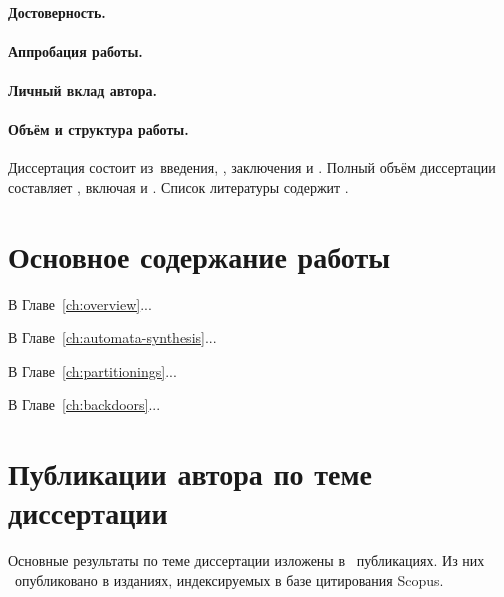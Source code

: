 \paragraph*{Достоверность.}
\paragraph*{Аппробация работы.}
\paragraph*{Личный вклад автора.}


\paragraph*{Объём и структура работы.}
Диссертация состоит из~введения,
,
заключения и
.
%
Полный объём диссертации составляет
, включая
 и
.
Список литературы содержит
.




\newpage
\section*{Основное содержание работы}

В Главе~\ref{ch:overview}...

В Главе~\ref{ch:automata-synthesis}...

В Главе~\ref{ch:partitionings}...

В Главе~\ref{ch:backdoors}...


\section*{Публикации автора по теме диссертации}

Основные результаты по теме диссертации изложены в \theAllMyPapers~публикациях.
Из них
\theScopusPapers~опубликовано в изданиях, индексируемых в базе цитирования Scopus.

